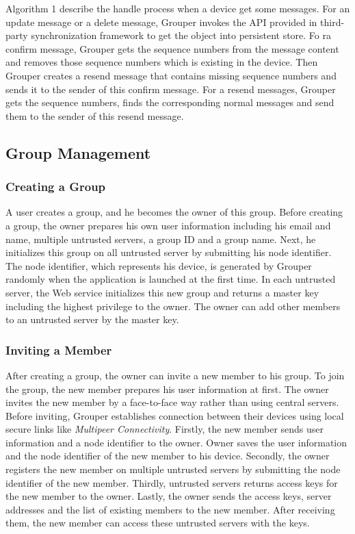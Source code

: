 \documentclass[twocolumn,10pt]{article}
\begin{document}
Algorithm 1 describe the handle process when a device get some messages.
For an update message or a delete message, Grouper invokes the API provided in third-party synchronization framework to get the object into persistent store.
Fo ra confirm message, Grouper gets the sequence numbers from the message content and removes those sequence numbers which is existing in the device.
Then Grouper creates a resend message that contains missing sequence numbers and sends it to the sender of this confirm message.
For a resend messages, Grouper gets the sequence numbers, finds the corresponding normal messages and send them to the sender of this resend message.

\subsection{Group Management}

\subsubsection{Creating a Group}

A user creates a group, and he becomes the owner of this group.  
Before creating a group, the owner prepares his own user information including his email and name, multiple untrusted servers, a group ID and a group name. 
Next, he initializes this group on all untrusted server by submitting his node identifier. 
The node identifier, which represents his device, is generated by Grouper randomly when the application is launched at the first time. 
In each untrusted server, the Web service initializes this new group and returns a master key including the highest privilege to the owner. 
The owner can add other members to an untrusted server by the master key.

\subsubsection{Inviting a Member}

After creating a group, the owner can invite a new member to his group. 
To join the group, the new member prepares his user information at first. 
The owner invites the new member by a face-to-face way rather than using central servers. 
Before inviting, Grouper establishes connection between their devices using local secure links like \emph{Multipeer Connectivity}\cite{mc}. 
Firstly, the new member sends user information and a node identifier to the owner. 
Owner saves the user information and the node identifier of the new member to his device. 
Secondly, the owner registers the new member on multiple untrusted servers by submitting the node identifier of the new member. 
Thirdly, untrusted servers returns access keys for the new member to the owner. 
Lastly, the owner sends the access keys, server addresses and the list of existing members to the new member. 
After receiving them, the new member can access these untrusted servers with the keys.
\end{document}
